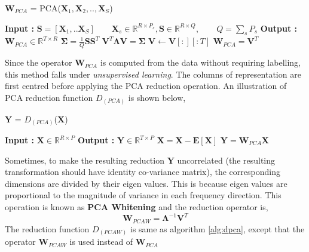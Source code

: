 \begin{algorithm}
  \caption{$\textbf{W}_{PCA}$ = PCA($\textbf{X}_{1}, \textbf{X}_{2},..,\textbf{X}_{S}$)}\label{alg:pca}
  \begin{algorithmic}[1]
    \Statex \textbf{Input :} $\textbf{S} = [\textbf{X}_{1},..\textbf{X}_{S}] \qquad \textbf{X}_{s} \in \mathbb{R}^{R \times P_{s}}, \textbf{S} \in \mathbb{R}^{R \times Q},\qquad  Q = \displaystyle\sum_{s}{P_{s}}$
    \Statex \textbf{Output :} $\textbf{W}_{PCA} \in \mathbb{R}^{T \times R}$
      \State $\bm{\Sigma} = \frac{1}{Q}\textbf{S}\textbf{S}^{T}$ 
      \State $\textbf{V}^{T} \bm{\Lambda} \textbf{V} = \bm{\Sigma}$ 
      \State $\textbf{V} \leftarrow \textbf{V}[:][:T]$ 
      \State $\textbf{W}_{PCA} = \textbf{V}^{T}$
  \end{algorithmic}
\end{algorithm}
\FloatBarrier

\noindent Since the operator $\textbf{W}_{PCA}$ is computed from the data without requiring labelling, this method falls under \textit{unsupervised learning}. The columns of representation are first centred before applying the PCA reduction operation. An illustration of PCA reduction function $D_{(PCA)}$ is shown below,

\begin{algorithm}
  \caption{$\textbf{Y}$ = $D_{(PCA)}$($\textbf{X}$)}\label{alg:dpca}
  \begin{algorithmic}[1]
    \Statex \textbf{Input :} $\textbf{X} \in \mathbb{R}^{R \times P}$
    \Statex \textbf{Output :} $\textbf{Y} \in \mathbb{R}^{T \times P}$
	\State $\textbf{\^X} = \textbf{X} - \textbf{E}[\textbf{X}]$
	\State $\textbf{Y} = \textbf{W}_{PCA}\textbf{\^X}$
  \end{algorithmic}
\end{algorithm}
\FloatBarrier

\noindent Sometimes, to make the resulting reduction $\textbf{Y}$ uncorrelated (the resulting transformation should have identity co-variance matrix), the corresponding dimensions are divided by their eigen values. This is because eigen values are proportional to the magnitude of variance in each frequency direction. This operation is known as \textbf{PCA Whitening} and the reduction operator is,
\[
\textbf{W}_{PCAW} = \bm{\Lambda}^{-1}\textbf{V}^{T}
\]    
The reduction function $D_{(PCAW)}$ is same as algorithm \ref{alg:dpca}, except that the operator $\textbf{W}_{PCAW}$ is used instead of $\textbf{W}_{PCA}$
\bigskip

